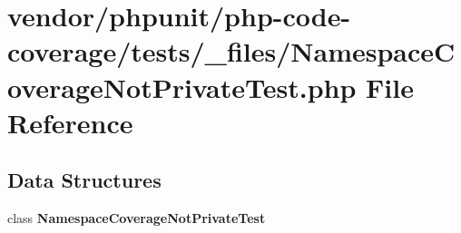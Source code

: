 \section{vendor/phpunit/php-\/code-\/coverage/tests/\+\_\+files/\+Namespace\+Coverage\+Not\+Private\+Test.php File Reference}
\label{php-code-coverage_2tests_2__files_2_namespace_coverage_not_private_test_8php}
\subsection*{Data Structures}
\begin{DoxyCompactItemize}
\item 
class {\bf Namespace\+Coverage\+Not\+Private\+Test}
\end{DoxyCompactItemize}

